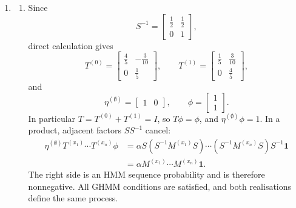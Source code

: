 \documentclass[11pt]{article}
\begin{document}
\begin{solution}[ex:p3-4]
\begin{enumerate}
      \item
        \begin{enumerate}
          \item Since
            \[
              S^{-1}=
                \begin{bmatrix}\tfrac12&\tfrac12\\0&1\end{bmatrix},
            \]
            direct calculation gives
            \[
              T^{(0)}=
                \begin{bmatrix}\tfrac45&-\tfrac3{10}\\0&\tfrac15\end{bmatrix},
              \qquad
              T^{(1)}=
                \begin{bmatrix}\tfrac15&\tfrac3{10}\\0&\tfrac45\end{bmatrix},
            \]
            and
            \[
              \eta^{(\emptyset)}=\begin{bmatrix}1&0\end{bmatrix},
              \qquad
              \phi=\begin{bmatrix}1\\1\end{bmatrix}.
            \]
            In particular $T=T^{(0)}+T^{(1)}=I$, so $T\phi=\phi$, and
            $\eta^{(\emptyset)}\phi=1$. In a product, adjacent factors
            $SS^{-1}$ cancel:
            \[
              \begin{aligned}
                \eta^{(\emptyset)}
                  T^{(x_1)}\cdots T^{(x_n)}\phi
                  &=
                  \alpha S(S^{-1}M^{(x_1)}S)\cdots
                    (S^{-1}M^{(x_n)}S)S^{-1}\mathbf1\\
                  &=\alpha M^{(x_1)}\cdots M^{(x_n)}\mathbf1.
              \end{aligned}
            \]
            The right side is an HMM sequence probability and is therefore
            nonnegative. All GHMM conditions are satisfied, and both
            realisations define the same process.


\end{enumerate}
\end{enumerate}
\end{solution}
\end{document}
